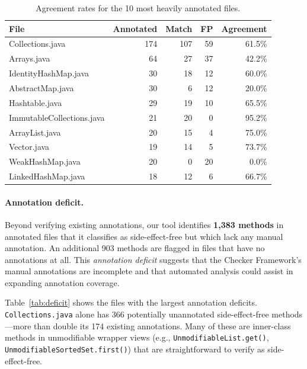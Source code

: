 \begin{table}[h]
\centering
\caption{Agreement rates for the 10 most heavily annotated files.}
\label{tab:per-file}
\begin{tabular}{lrrrr}
\toprule
\textbf{File} & \textbf{Annotated} & \textbf{Match} & \textbf{FP} & \textbf{Agreement} \\
\midrule
Collections.java       & 174 & 107 &  59 & 61.5\% \\
Arrays.java            &  64 &  27 &  37 & 42.2\% \\
IdentityHashMap.java   &  30 &  18 &  12 & 60.0\% \\
AbstractMap.java       &  30 &   6 &  12 & 20.0\% \\
Hashtable.java         &  29 &  19 &  10 & 65.5\% \\
ImmutableCollections.java & 21 & 20 &   0 & 95.2\% \\
ArrayList.java         &  20 &  15 &   4 & 75.0\% \\
Vector.java            &  19 &  14 &   5 & 73.7\% \\
WeakHashMap.java       &  20 &   0 &  20 &  0.0\% \\
LinkedHashMap.java     &  18 &  12 &   6 & 66.7\% \\
\bottomrule
\end{tabular}
\end{table}




\paragraph{Annotation deficit.}
Beyond verifying existing annotations, our tool identifies \textbf{1,383 methods} in annotated files that it classifies as side-effect-free but which lack any manual annotation.
An additional 903 methods are flagged in files that have no annotations at all.
This \emph{annotation deficit} suggests that the Checker Framework's manual annotations are incomplete and that automated analysis could assist in expanding annotation coverage.

Table~\ref{tab:deficit} shows the files with the largest annotation deficits.
\texttt{Collections.java} alone has 366 potentially unannotated side-effect-free methods---more than double its 174 existing annotations.
Many of these are inner-class methods in unmodifiable wrapper views (e.g., \texttt{UnmodifiableList.get()}, \texttt{UnmodifiableSortedSet.first()}) that are straightforward to verify as side-effect-free.

